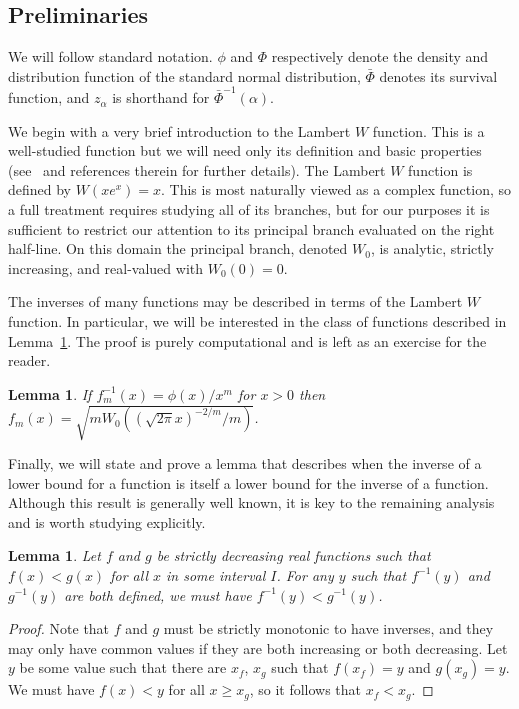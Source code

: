 \documentclass[12pt]{article}
\numberwithin{theorem}{section}
\newtheorem{lemma}[theorem]{Lemma}
\begin{document}
\subsection{Preliminaries}
\label{sec_ineq_prelim}

We will follow standard notation.  $\phi$ and $\Phi$ respectively denote the density and distribution function of the standard normal distribution, $\bar{\Phi}$ denotes its survival function, and $z_\alpha$ is shorthand for $\bar{\Phi}^{-1}(\alpha)$.

We begin with a very brief introduction to the Lambert $W$ function.  This is a well-studied function but we will need only its definition and basic properties (see~\cite{roy2010functions} and references therein for further details).  The Lambert $W$ function is defined by $W\left(xe^x\right) = x$.  This is most naturally viewed as a complex function, so a full treatment requires studying all of its branches, but for our purposes it is sufficient to restrict our attention to its principal branch evaluated on the right half-line.  On this domain the principal branch, denoted $W_0$, is analytic, strictly increasing, and real-valued with $W_0(0) = 0$.

The inverses of many functions may be described in terms of the Lambert $W$ function.  In particular, we will be interested in the class of functions described in Lemma~\ref{lem_lambert}.  The proof is purely computational and is left as an exercise for the reader.

\begin{lemma}
\label{lem_lambert}
If $f_m^{-1}(x) = \phi(x) / x^m$ for $x > 0$ then $f_m(x) = \sqrt{mW_0\left(\left(\sqrt{2\pi} x\right)^{-2 / m} / m\right)}$.
\end{lemma}

Finally, we will state and prove a lemma that describes when the inverse of a lower bound for a function is itself a lower bound for the inverse of a function.  Although this result is generally well known, it is key to the remaining analysis and is worth studying explicitly.

\begin{lemma}
\label{lem_inversion}
Let $f$ and $g$ be strictly decreasing real functions such that $f(x) < g(x)$ for all $x$ in some interval $I$.  For any $y$ such that $f^{-1}(y)$ and $g^{-1}(y)$ are both defined, we must have $f^{-1}(y) < g^{-1}(y)$.
\end{lemma}
\begin{proof}
Note that $f$ and $g$ must be strictly monotonic to have inverses, and they may only have common values if they are both increasing or both decreasing.  Let $y$ be some value such that there are $x_f$, $x_g$ such that $f(x_f) = y$ and $g(x_g) = y$.  We must have $f(x) < y$ for all $x \geq x_g$, so it follows that $x_f < x_g$.
\end{proof}
\end{document}
